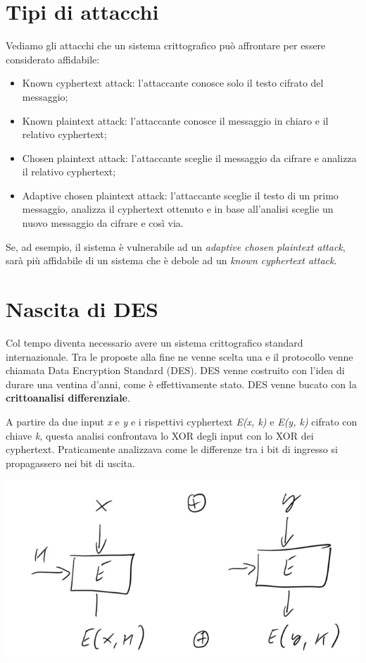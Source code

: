 \section{Tipi di attacchi} 
Vediamo gli attacchi che un sistema crittografico può affrontare per essere considerato affidabile:
\begin{itemize}
    \item Known cyphertext attack: l'attaccante conosce solo il testo cifrato del messaggio;
    \item Known plaintext attack: l'attaccante conosce il messaggio in chiaro e il relativo cyphertext;
    \item Chosen plaintext attack: l'attaccante sceglie il messaggio da cifrare e analizza il relativo cyphertext;
    \item Adaptive chosen plaintext attack: l'attaccante sceglie il testo di un primo messaggio, analizza il cyphertext ottenuto e in base all'analisi sceglie un nuovo messaggio da cifrare e così via.
\end{itemize}

Se, ad esempio, il sistema è vulnerabile ad un \textit{adaptive chosen plaintext attack}, sarà più affidabile di un sistema che è debole ad un \textit{known cyphertext attack}.

\section{Nascita di DES} 
Col tempo diventa necessario avere un sistema crittografico standard internazionale. Tra le proposte alla fine ne venne scelta una e il protocollo venne chiamata Data Encryption Standard (DES). DES venne costruito con l'idea di durare una ventina d'anni, come è effettivamente stato. DES venne bucato con la \textbf{crittoanalisi differenziale}.

A partire da due input \textit{x} e \textit{y} e i rispettivi cyphertext \textit{E(x, k)} e \textit{E(y, k)} cifrato con chiave \textit{k}, questa analisi confrontava lo XOR degli input con lo XOR dei cyphertext. Praticamente analizzava come le differenze tra i bit di ingresso si propagassero nei bit di uscita. 

\begin{center}
    \includegraphics[width=1\textwidth]{images/1.png}
\end{center}


